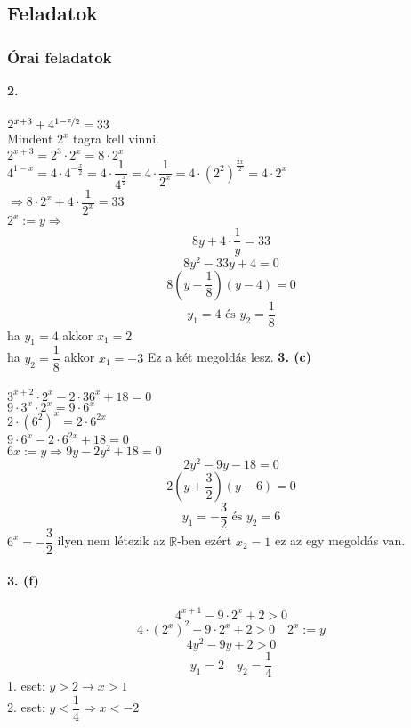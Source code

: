 \documentclass[12pt,a4paper,fleqn]{article}
\begin{document}
\subsection{Feladatok}
\subsubsection{Órai feladatok}
\textbf{2.} \\\\
$2^{x+3} + 4^{1-\nicefrac{x}{2}} = 33$ \\
Mindent $2^x$ tagra kell vinni. \\
$2^{x+3} = 2^3 \cdot 2^x = 8 \cdot 2^x$ \\
$4^{1-x} = 4 \cdot 4^{-\frac{x}{2}} = 4 \cdot \dfrac{1}{4^{\frac{x}{2}}} = 4 \cdot \dfrac{1}{2^x} = 4 \cdot (2^2)^{\frac{2x}{2}} = 4 \cdot 2^x$ \\
$\Rightarrow 8 \cdot 2^x + 4 \cdot \dfrac{1}{2^x} = 33$ \\
$2^x := y \Rightarrow$ \\
$$8y + 4 \cdot \dfrac{1}{y} = 33$$
$$ 8y^2 - 33y + 4 = 0 $$
$$ 8(y-\dfrac{1}{8})(y-4) =0 $$
$$ y_1 = 4 \text{ és } y_2 = \dfrac{1}{8} $$
ha $y_1 = 4$ akkor $x_1 = 2$ \\
ha $y_2 = \dfrac{1}{8}$ akkor $x_1 = -3$
Ez a két megoldás lesz.
\textbf{3. (c)} \\\\
$ 3^{x+2} \cdot 2^x - 2 \cdot 36^x + 18 = 0$ \\
$ 9 \cdot 3^x \cdot 2^x = 9 \cdot 6^x $ \\
$ 2 \cdot (6^2)^x= 2 \cdot 6^{2x}$ \\
$ 9 \cdot 6^x - 2 \cdot 6^{2x} + 18 = 0 $ \\
$ 6x := y \Rightarrow 9y - 2y^2 + 18 = 0 $ \\
$$ 2y^2 - 9y - 18 = 0 $$
$$ 2(y+\dfrac{3}{2})(y-6) = 0 $$
$$ y_1=-\dfrac{3}{2} \text{ és } y_2 = 6$$
$ 6^x = -\dfrac{3}{2}$ ilyen nem létezik az $\mathbb{R}$-ben ezért $ x_2 = 1 $ ez az egy megoldás van. \\\\
\textbf{3. (f)} \\\\
$$ 4^{x+1} - 9 \cdot 2^x + 2 > 0 $$
$$ 4 \cdot (2^x)^2 - 9 \cdot 2^x + 2 > 0 \quad 2^x:=y$$
$$ 4y^2 - 9y + 2 > 0 $$
$$ y_1 = 2 \quad y_2 = \dfrac{1}{4} $$
1. eset: $y > 2 \rightarrow x > 1$ \\
2. eset: $y < \dfrac{1}{4} \Rightarrow x < -2 $ \\\\
\end{document}
